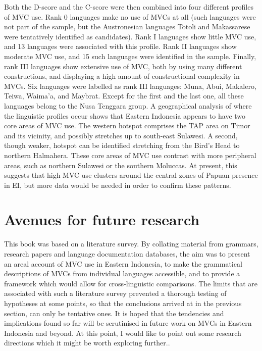 Both the D-score and the C-score were then combined into four different profiles of MVC use. Rank 0 languages make no use of MVCs at all (such languages were not part of the sample, but the Austronesian languages Totoli and Makassarese were tentatively identified as candidates). Rank I languages show little MVC use, and 13 languages were associated with this profile. Rank II languages show moderate MVC use, and 15 such languages were identified in the sample. Finally, rank III languages show extensive use of MVC, both by using many different constructions, and displaying a high amount of constructional complexity in MVCs. Six languages were labelled as rank III languages: Muna, Abui, Makalero, Teiwa, Waima'a, and Maybrat. Except for the first and the last one, all these languages belong to the Nusa Tenggara group. A geographical analysis of where the linguistic profiles occur shows that Eastern Indonesia appears to have two core areas of MVC use. The western hotspot comprises the TAP area on Timor and its vicinity, and possibly stretches up to south-east Sulawesi. A second, though weaker, hotspot can be identified stretching from the Bird's Head to northern Halmahera. These core areas of MVC use contrast with more peripheral areas, such as northern Sulawesi or the southern Moluccas. At present, this suggests that high MVC use clusters around the central zones of Papuan presence in EI, but more data would be needed in order to confirm these patterns.

\section{Avenues for future research}

This book was based on a literature survey. By collating material from grammars, research papers and language documentation databases, the aim was to present an areal account of MVC use in Eastern Indonesia, to make the grammatical descriptions of MVCs from individual languages accessible, and to provide a framework which would allow for cross-linguistic comparisons. The limits that are associated with such a literature survey prevented a thorough testing of hypotheses at some points, so that the conclusions arrived at in the previous section, can only be tentative ones. It is hoped that the tendencies and implications found so far will be scrutinised in future work on MVCs in Eastern Indonesia and beyond. At this point, I would like to point out some research directions which it might be worth exploring further..

